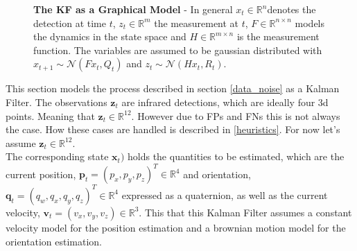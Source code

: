 \documentclass{article}
\begin{document}
\begin{figure}[!h]
	\centering
{}
\caption{\textbf{The KF as a Graphical Model} - In general  $x_t \in \mathbb{R}^n$denotes the detection at time $t$, $z_t \in \mathbb{R}^m$ the measurement at $t$, $F \in \mathbb{R}^{n \times n}$ models the dynamics in the state space and $H \in \mathbb{R}^{m \times n}$ is the measurement function. The variables are assumed to be gaussian distributed with $x_{t+1} \sim \mathcal{N}(Fx_t, Q_t)$ and $z_t \sim \mathcal{N}(Hx_t, R_t)$.}
\label{graphical_model}
\end{figure}


This section models the process described in section \ref{data_noise} as a Kalman Filter. The observations $\mathbf{z}_t$ are infrared detections, which are ideally four 3d points. Meaning that $\mathbf{z}_t \in \mathbb{R}^{12}$. However due to FPs and FNs this is not always the case. How these cases are handled is described in \ref{heuristics}. For now let's assume  $\mathbf{z}_t \in \mathbb{R}^{12}$. \\
The corresponding state $\mathbf{x}_t)$ holds the quantities to be estimated, which are the current position, $\mathbf{p}_t = (p_x, p_y, p_z)^T \in \mathbb{R}^4$ and orientation, $\mathbf{q}_t=(q_w, q_x, q_y, q_z)^T \in \mathbb{R}^4$ expressed as a quaternion, %
as well as the current velocity, $\mathbf{v}_t=(v_x, v_y, v_z) \in \mathbb{R}^3$. This that this Kalman Filter assumes a constant velocity model for the position estimation and a brownian motion model for the orientation estimation. %
\end{document}
